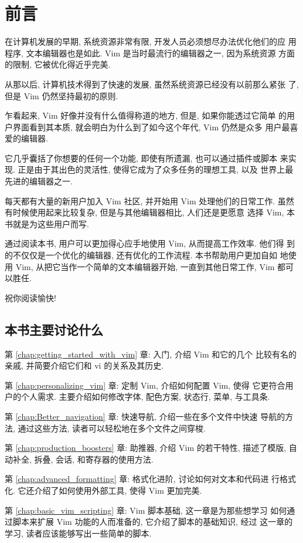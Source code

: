 \chapter{前言}
\label{chap:preface}
在计算机发展的早期, 系统资源非常有限, 开发人员必须想尽办法优化他们的应
用程序, 文本编辑器也是如此. Vim 是当时最流行的编辑器之一, 因为系统资源
方面的限制, 它被优化得近乎完美.

从那以后, 计算机技术得到了快速的发展, 虽然系统资源已经没有以前那么紧张
了, 但是 Vim 仍然坚持最初的原则.

乍看起来, Vim 好像并没有什么值得称道的地方, 但是, 如果你能透过它简单
的用户界面看到其本质, 就会明白为什么到了如今这个年代, Vim 仍然是众多
用户最喜爱的编辑器.

它几乎囊括了你想要的任何一个功能, 即使有所遗漏, 也可以通过插件或脚本
来实现. 正是由于其出色的灵活性, 使得它成为了众多任务的理想工具, 以及
世界上最先进的编辑器之一.

每天都有大量的新用户加入 Vim 社区, 并开始用 Vim 处理他们的日常工作.
虽然有时候使用起来比较复杂, 但是与其他编辑器相比, 人们还是更愿意
选择 Vim, 本书就是为这些用户而写.

通过阅读本书, 用户可以更加得心应手地使用 Vim, 从而提高工作效率. 他们得
到的不仅仅是一个优化的编辑器, 还有优化的工作流程. 本书帮助用户更加自如
地使用 Vim, 从把它当作一个简单的文本编辑器开始, 一直到其他日常工作, Vim
都可以胜任.

祝你阅读愉快!

\section*{本书主要讨论什么}
第 \ref{chap:getting_started_with_vim} 章: 入门, 介绍 Vim 和它的几个
比较有名的亲戚, 并简要介绍它们和 vi 的关系及其历史.

第 \ref{chap:personalizing_vim} 章: 定制 Vim, 介绍如何配置 Vim, 使得
它更符合用户的个人需求. 主要介绍如何修改字体, 配色方案, 状态行, 菜单,
与工具条.

第 \ref{chap:Better_navigation} 章: 快速导航, 介绍一些在多个文件中快速
导航的方法, 通过这些方法, 读者可以轻松地在多个文件之间穿梭.

第 \ref{chap:production_boosters} 章: 助推器, 介绍 Vim 的若干特性,
描述了模版, 自动补全, 拆叠, 会话, 和寄存器的使用方法.

第 \ref{chap:advanced_formatting} 章: 格式化进阶, 讨论如何对文本和代码进
行格式化. 它还介绍了如何使用外部工具, 使得 Vim 更加完美.

第 \ref{chap:basic_vim_scripting} 章: Vim 脚本基础, 这一章是为那些想学习
如何通过脚本来扩展 Vim 功能的人而准备的, 它介绍了脚本的基础知识, 经过
这一章的学习, 读者应该能够写出一些简单的脚本.


